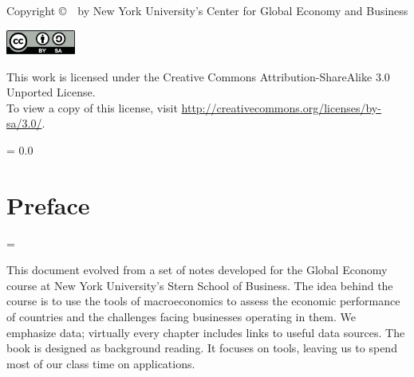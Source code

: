 \begin{titlepage}
Copyright \copyright \ \number\year \ by New York University's Center for Global Economy and Business

\begin{minipage}{0.9in}
\begin{flushleft}
\includegraphics[width=0.9in]{Figures/by_sa.pdf}\\
\vfill
\vspace{0.37in}
\phantom{m}
\end{flushleft}
\end{minipage}
\hspace{0.1in}
%
\begin{minipage}{0.70\textwidth}
\begin{flushleft}
 This work is licensed under the Creative Commons Attribution-ShareAlike 3.0 Unported License.\\
 \vspace{0.15in}
 To view a copy of this license, visit \url{http://creativecommons.org/licenses/by-sa/3.0/}.\\
 \end{flushleft}
\end{minipage}
\end{titlepage}


\parskip = 0.0\bigskipamount
\tableofcontents

\chapter*{Preface}
\parskip = \bigskipamount

This document evolved from a set of notes developed
for the Global Economy course at New York
University's Stern School of Business.
The idea behind the course is to use the tools of macroeconomics
to assess the economic performance of countries
and the challenges facing businesses operating in them.
We emphasize data;
virtually every chapter includes links to useful data sources.
The book is designed as background reading.
It focuses on tools,
leaving us to spend most of our class time on applications.

